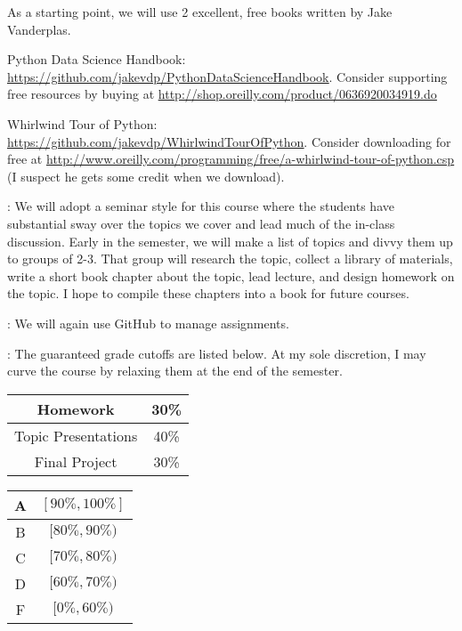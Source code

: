 \documentclass[letterpaper]{article}
\begin{document}
As a starting point, we will use 2 excellent, free books written by Jake Vanderplas.
\bit
	\item Python Data Science Handbook:  \href{https://github.com/jakevdp/PythonDataScienceHandbook}{\underline{https://github.com/jakevdp/PythonDataScienceHandbook}}.  Consider supporting free resources by buying at \href{http://shop.oreilly.com/product/0636920034919.do}{\underline{http://shop.oreilly.com/product/0636920034919.do}}
	\item Whirlwind Tour of Python:  \href{https://github.com/jakevdp/WhirlwindTourOfPython}{\underline{https://github.com/jakevdp/WhirlwindTourOfPython}}.  Consider downloading for free at \href{http://www.oreilly.com/programming/free/a-whirlwind-tour-of-python.csp}{\underline{http://www.oreilly.com/programming/free/a-whirlwind-tour-of-python.csp}}  (I suspect he gets some credit when we download).
\eit

: We will adopt a seminar style for this course where the students have substantial sway over the topics we cover and lead much of the in-class discussion.  Early in the semester, we will make a list of topics and divvy them up to groups of 2-3.  That group will research the topic, collect a library of materials, write a short book chapter about the topic, lead lecture, and design homework on the topic.  I hope to compile these chapters into a book for future courses.

\bu[Homework]: We will again use GitHub to manage assignments.
 
: The guaranteed grade cutoffs are listed below.  At my sole discretion, I may curve the course by relaxing them at the end of the semester.

\begin{center}
	\begin{tabular}{|c|c|} \hline
		Homework & 30\%\\ \hline
		Topic Presentations & 40\%\\ \hline
		Final Project & 30\%\\\hline
	\end{tabular}
	\quad
	\begin{tabular}{|c|c|} \hline
		A & $[90\%,100\%]$\\ \hline
		B & $[80\%,90\%)$\\ \hline
		C & $[70\%,80\%)$\\ \hline
		D & $[60\%,70\%)$\\ \hline
		F & $[0\%,60\%)$\\ \hline
	\end{tabular}
\end{center}
\end{document}
